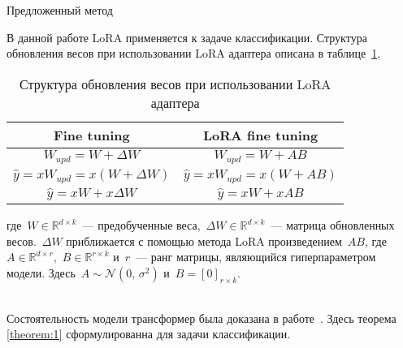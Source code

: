 \documentclass[9pt,pdf,hyperref={unicode}]{beamer}
\begin{document}
\begin{frame}[shrink=5]{Предложенный метод}
\justifying

В данной работе LoRA применяется к задаче классификации. Структура обновления весов при использовании LoRA адаптера описана в таблице~\ref{table:1},
\begin{table}[ht!]
    \centering
\begin{tabular}{ | c | c| } 
 \hline
  Fine tuning & LoRA fine tuning\\ 
 \hline
 $W_{upd} = W + \Delta W$ & $W_{upd} = W + AB$\\ 
 $\hat{y} = xW_{upd}= x(W + \Delta W)$ & $\hat{y} = xW_{upd}= x(W + AB)$\\
 $\hat{y} = xW + x\Delta W$ & $\hat{y} = xW + xAB$ \\
 \hline
\end{tabular}
    \caption{Структура обновления весов при использовании LoRA адаптера}
    \label{table:1}
\end{table}

где~$W \in \mathbb{R}^{d \times k}$~--- предобученные веса,~$\Delta W \in \mathbb{R}^{d \times k}$~--- матрица обновленных весов.~$\Delta W$ приближается с помощью метода LoRA произведением~$AB$, где~$A \in \mathbb{R}^{d \times r}$,~$B \in \mathbb{R}^{r \times k}$ и~$r$~--- ранг матрицы, являющийся гиперпараметром модели. Здесь~$A \sim \mathcal{N}(0,\,\sigma^{2})$ и~$B = [0]_{r \times k}$. 

~\\
Состоятельность модели трансформер была доказана в работе~\cite{lee2023mathematical}. Здесь теорема \ref{theorem:1} сформулированна для задачи классификации.
\end{frame}
\end{document}
